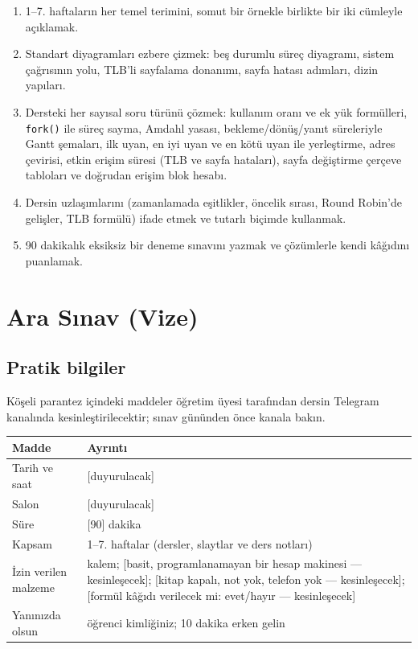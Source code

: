 \documentclass[11pt,a4paper]{article}
\newcommand{\cmd}[1]{\texttt{#1}}
\begin{document}
\vspace{0.8em}
\begin{keyidea}
\begin{enumerate}[leftmargin=1.4em]
  \item 1--7. haftaların her temel terimini, somut bir örnekle birlikte bir iki cümleyle açıklamak.
  \item Standart diyagramları ezbere çizmek: beş durumlu süreç diyagramı, sistem çağrısının yolu, TLB'li sayfalama donanımı, sayfa hatası adımları, dizin yapıları.
  \item Dersteki her sayısal soru türünü çözmek: kullanım oranı ve ek yük formülleri, \cmd{fork()} ile süreç sayma, Amdahl yasası, bekleme/dönüş/yanıt süreleriyle Gantt şemaları, ilk uyan, en iyi uyan ve en kötü uyan ile yerleştirme, adres çevirisi, etkin erişim süresi (TLB ve sayfa hataları), sayfa değiştirme çerçeve tabloları ve doğrudan erişim blok hesabı.
  \item Dersin uzlaşımlarını (zamanlamada eşitlikler, öncelik sırası, Round Robin'de gelişler, TLB formülü) ifade etmek ve tutarlı biçimde kullanmak.
  \item 90 dakikalık eksiksiz bir deneme sınavını yazmak ve çözümlerle kendi kâğıdını puanlamak.
\end{enumerate}
\end{keyidea}

\setcounter{tocdepth}{1}
\tableofcontents

\section{Ara Sınav (Vize)}
\label{sec:exam}
\subsection{Pratik bilgiler}
Köşeli parantez içindeki maddeler öğretim üyesi tarafından dersin Telegram kanalında kesinleştirilecektir; sınav gününden önce kanala bakın.
\begin{center}
\renewcommand{\arraystretch}{1.3}
\begin{tabularx}{\linewidth}{>{\raggedright\arraybackslash}p{4.0cm} X}
\toprule
\textbf{Madde} & \textbf{Ayrıntı} \\
\midrule
Tarih ve saat & [duyurulacak] \\
Salon & [duyurulacak] \\
Süre & [90] dakika \\
Kapsam & 1--7. haftalar (dersler, slaytlar ve ders notları) \\
İzin verilen malzeme & kalem; [basit, programlanamayan bir hesap makinesi --- kesinleşecek]; [kitap kapalı, not yok, telefon yok --- kesinleşecek]; [formül kâğıdı verilecek mi: evet/hayır --- kesinleşecek] \\
Yanınızda olsun & öğrenci kimliğiniz; 10 dakika erken gelin \\
\bottomrule
\end{tabularx}
\end{center}
\end{document}
